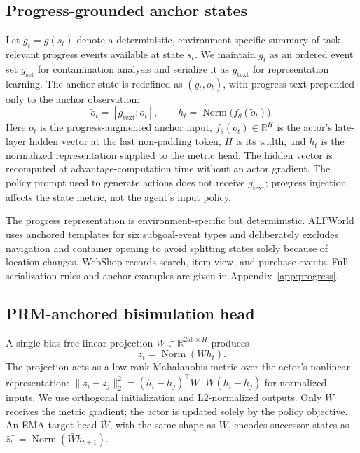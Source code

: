 \documentclass[10pt,twocolumn,letterpaper]{article}
\begin{document}
\subsection{Progress-grounded anchor states}
Let $g_t=g(s_t)$ denote a deterministic, environment-specific summary of task-relevant progress events available at state $s_t$. We maintain $g_t$ as an ordered event set $g_{\mathrm{set}}$ for contamination analysis and serialize it as $g_{\mathrm{text}}$ for representation learning. The anchor state is redefined as $(g_t,o_t)$, with progress text prepended only to the anchor observation:
\begin{equation}
\tilde o_t=[g_{\mathrm{text}};o_t],\qquad
h_t=\operatorname{Norm}\bigl(f_\theta(\tilde o_t)\bigr).
\end{equation}
Here $\tilde o_t$ is the progress-augmented anchor input, $f_\theta(\tilde o_t)\in\mathbb R^H$ is the actor's late-layer hidden vector at the last non-padding token, $H$ is its width, and $h_t$ is the normalized representation supplied to the metric head. The hidden vector is recomputed at advantage-computation time without an actor gradient. The policy prompt used to generate actions does not receive $g_{\mathrm{text}}$; progress injection affects the state metric, not the agent's input policy.

The progress representation is environment-specific but deterministic. ALFWorld uses anchored templates for six subgoal-event types and deliberately excludes navigation and container opening to avoid splitting states solely because of location changes. WebShop records search, item-view, and purchase events. Full serialization rules and anchor examples are given in Appendix~\ref{app:progress}.

\subsection{PRM-anchored bisimulation head}
A single bias-free linear projection $W\in\mathbb R^{256\times H}$ produces
\begin{equation}
z_t=\operatorname{Norm}(Wh_t).
\end{equation}
The projection acts as a low-rank Mahalanobis metric over the actor's nonlinear representation: $\|z_i-z_j\|_2^2=(h_i-h_j)^\top W^\top W(h_i-h_j)$ for normalized inputs. We use orthogonal initialization and L2-normalized outputs. Only $W$ receives the metric gradient; the actor is updated solely by the policy objective. An EMA target head $\bar W$, with the same shape as $W$, encodes successor states as $\bar z_t^{+}=\operatorname{Norm}(\bar Wh_{t+1})$.
\end{document}
